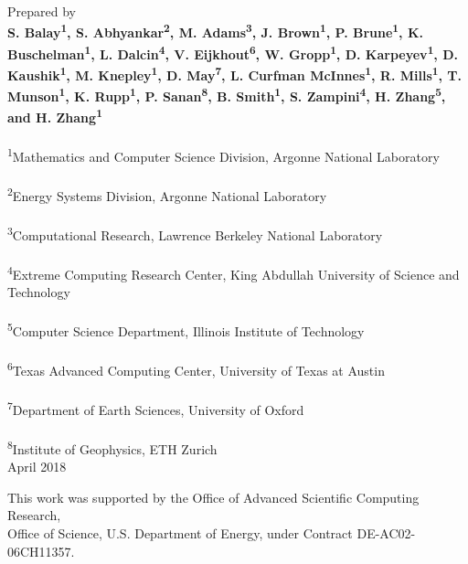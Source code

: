 \vspace*{0.5in}
\noindent Prepared by \\
{\bf S. Balay\textsuperscript{1}, S. Abhyankar\textsuperscript{2}, M. Adams\textsuperscript{3}, J. Brown\textsuperscript{1}, P. Brune\textsuperscript{1}, K. Buschelman\textsuperscript{1},
L. Dalcin\textsuperscript{4}, V. Eijkhout\textsuperscript{6}, W. Gropp\textsuperscript{1}, D. Karpeyev\textsuperscript{1},
D. Kaushik\textsuperscript{1}, M. Knepley\textsuperscript{1}, D. May\textsuperscript{7}, L. Curfman McInnes\textsuperscript{1}, R. Mills\textsuperscript{1}, T. Munson\textsuperscript{1},
K. Rupp\textsuperscript{1}, P. Sanan\textsuperscript{8}, B. Smith\textsuperscript{1}, S. Zampini\textsuperscript{4}, H. Zhang\textsuperscript{5}, and H. Zhang\textsuperscript{1}}\\
\\
\textsuperscript{1}Mathematics and Computer Science Division, Argonne National Laboratory \\
\\
\textsuperscript{2}Energy Systems Division, Argonne National Laboratory \\
\\
\textsuperscript{3}Computational Research, Lawrence Berkeley National Laboratory \\
\\
\textsuperscript{4}Extreme Computing Research Center, King Abdullah University of Science and Technology\\
\\
\textsuperscript{5}Computer Science Department, Illinois Institute of Technology\\
\\
\textsuperscript{6}Texas Advanced Computing Center, University of Texas at Austin\\
\\
\textsuperscript{7}Department of Earth Sciences, University of Oxford\\
\\
\textsuperscript{8}Institute of Geophysics, ETH Zurich\\


\vspace*{30pt}
\noindent April 2018

\vspace*{20pt}
\noindent This work was supported by the Office of Advanced Scientific Computing Research, \\
Office of Science, U.S. Department of Energy, under Contract DE-AC02-06CH11357.


